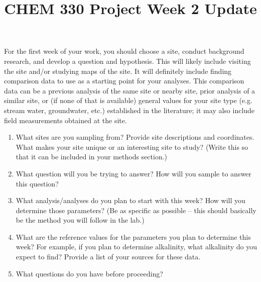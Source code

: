 \documentclass[11pt]{article}
\date{}
\title{CHEM 330 Project Week 2 Update}
\begin{document}
\maketitle
\noindent For the first week of your work, you should choose a site, conduct background research, and develop a question and hypothesis.  This will likely include visiting the site and/or studying maps of the site.  It will definitely include finding comparison data to use as a starting point for your analyses.  This comparison data can be a previous analysis of the same site or nearby site, prior analysis of a similar site, or (if none of that is available) general values for your site type (e.g. stream water, groundwater, etc.) established in the literature; it may also include field measurements obtained at the site.

\begin{enumerate}
\item What sites are you sampling from?  Provide site descriptions and coordinates.  What makes your site unique or an interesting site to study? (Write this so that it can be included in your methods section.)

\item What question will you be trying to answer?  How will you sample to answer this question?

\item What analysis/analyses do you plan to start with this week?  How will you determine those parameters? (Be as specific as possible -- this should basically be the method you will follow in the lab.)

\item What are the reference values for the parameters you plan to determine this week?  For example, if you plan to determine alkalinity, what alkalinity do you expect to find?  Provide a list of your sources for these data.

\item What questions do you have before proceeding?
\end{enumerate}
\end{document}
